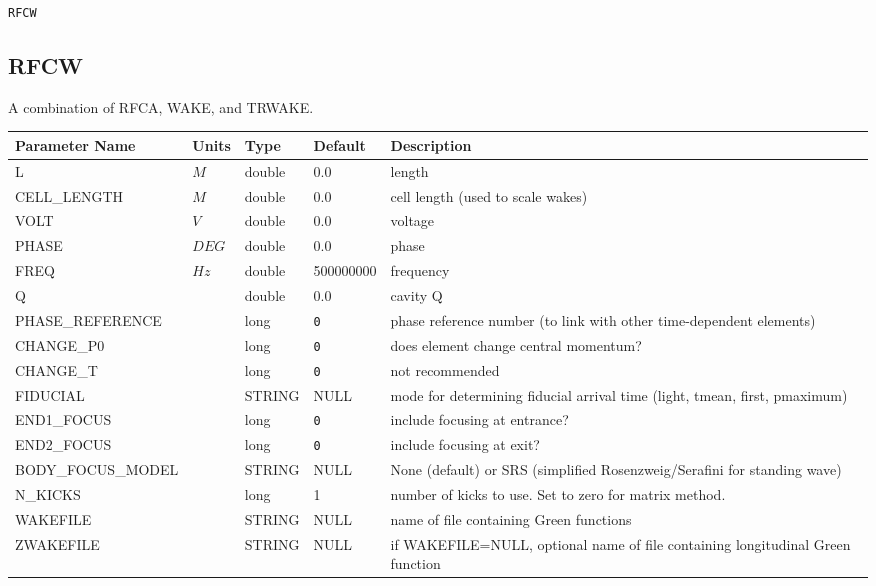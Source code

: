 \vspace*{0.5in}

\begin{latexonly}
\newpage
\begin{center}{\Large\verb|RFCW|}\end{center}
\end{latexonly}\subsection{RFCW}
A combination of RFCA, WAKE, and TRWAKE.
\\
\begin{tabular}{|l|l|l|l|p{\descwidth}|} \hline
Parameter Name & Units & Type & Default & Description \\ \hline 
L & $M$ & double &  0.0 & length  \\ \hline 
CELL\_LENGTH & $M$ & double &  0.0 & cell length (used to scale wakes)  \\ \hline 
VOLT & $V$ & double &  0.0 & voltage  \\ \hline 
PHASE & $DEG$ & double &  0.0 & phase  \\ \hline 
FREQ & $Hz$ & double &   500000000 & frequency  \\ \hline 
Q &  & double &  0.0 & cavity Q  \\ \hline 
PHASE\_REFERENCE &  & long &  \verb|0| & phase reference number (to link with other time-dependent elements)  \\ \hline 
CHANGE\_P0 &  & long &  \verb|0| & does element change central momentum?  \\ \hline 
CHANGE\_T &  & long &  \verb|0| & not recommended  \\ \hline 
FIDUCIAL &  & STRING &   NULL            & mode for determining fiducial arrival time (light, tmean, first, pmaximum)  \\ \hline 
END1\_FOCUS &  & long &  \verb|0| & include focusing at entrance?  \\ \hline 
END2\_FOCUS &  & long &  \verb|0| & include focusing at exit?  \\ \hline 
BODY\_FOCUS\_MODEL &  & STRING &   NULL            & None (default) or SRS (simplified Rosenzweig/Serafini for standing wave)  \\ \hline 
N\_KICKS &  & long &   1               & number of kicks to use.  Set to zero for matrix method.  \\ \hline 
WAKEFILE &  & STRING &   NULL            & name of file containing Green functions  \\ \hline 
ZWAKEFILE &  & STRING &   NULL            & if WAKEFILE=NULL, optional name of file containing longitudinal Green function  \\ \hline 

\end{tabular}
